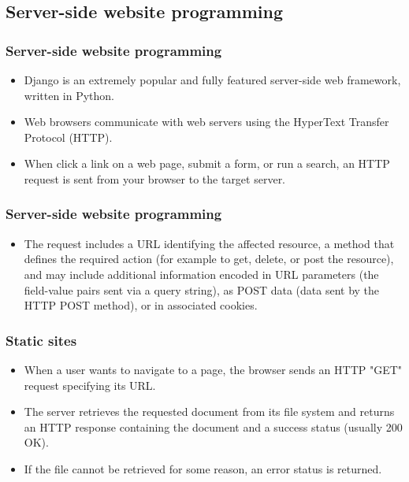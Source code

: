 \documentclass{beamer}
\begin{document}
\subsection{Server-side website programming}
\begin{frame}
	\frametitle{Server-side website programming}
 \begin{itemize}
    \item Django is an extremely popular and fully featured server-side web framework, written in Python. 
    \item Web browsers communicate with web servers using the HyperText Transfer Protocol (HTTP). 
    \item When click a link on a web page, submit a form, or run a search, an HTTP request is sent from your browser to the target server.
\end{itemize} 	
\end{frame}
\begin{frame}
	\frametitle{Server-side website programming}
 \begin{itemize}
    \item The request includes a URL identifying the affected resource, a method that defines the required action (for example to get, delete, or post the resource), and may include additional information encoded in URL parameters (the field-value pairs sent via a query string), as POST data (data sent by the HTTP POST method), or in associated cookies.
\end{itemize} 	
\end{frame}
\begin{frame}
\frametitle{Static sites}
\begin{itemize}
    \item When a user wants to navigate to a page, the browser sends an HTTP "GET" request specifying its URL.
\item The server retrieves the requested document from its file system and returns an HTTP response containing the document and a success status (usually 200 OK). 
\item If the file cannot be retrieved for some reason, an error status is returned.
\end{itemize}
\end{frame}
\end{document}
